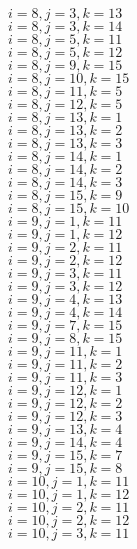 \documentclass[14pt]{article}
\begin{document}
    $i=8,j=3,k=13 $ \\ 
    $i=8,j=3,k=14 $ \\ 
    $i=8,j=5,k=11 $ \\ 
    $i=8,j=5,k=12 $ \\ 
    $i=8,j=9,k=15 $ \\ 
    $i=8,j=10,k=15 $ \\ 
    $i=8,j=11,k=5 $ \\ 
    $i=8,j=12,k=5 $ \\ 
    $i=8,j=13,k=1 $ \\ 
    $i=8,j=13,k=2 $ \\ 
    $i=8,j=13,k=3 $ \\ 
    $i=8,j=14,k=1 $ \\ 
    $i=8,j=14,k=2 $ \\ 
    $i=8,j=14,k=3 $ \\ 
    $i=8,j=15,k=9 $ \\ 
    $i=8,j=15,k=10 $ \\ 
    $i=9,j=1,k=11 $ \\ 
    $i=9,j=1,k=12 $ \\ 
    $i=9,j=2,k=11 $ \\ 
    $i=9,j=2,k=12 $ \\ 
    $i=9,j=3,k=11 $ \\ 
    $i=9,j=3,k=12 $ \\ 
    $i=9,j=4,k=13 $ \\ 
    $i=9,j=4,k=14 $ \\ 
    $i=9,j=7,k=15 $ \\ 
    $i=9,j=8,k=15 $ \\ 
    $i=9,j=11,k=1 $ \\ 
    $i=9,j=11,k=2 $ \\ 
    $i=9,j=11,k=3 $ \\ 
    $i=9,j=12,k=1 $ \\ 
    $i=9,j=12,k=2 $ \\ 
    $i=9,j=12,k=3 $ \\ 
    $i=9,j=13,k=4 $ \\ 
    $i=9,j=14,k=4 $ \\ 
    $i=9,j=15,k=7 $ \\ 
    $i=9,j=15,k=8 $ \\ 
    $i=10,j=1,k=11 $ \\ 
    $i=10,j=1,k=12 $ \\ 
    $i=10,j=2,k=11 $ \\ 
    $i=10,j=2,k=12 $ \\ 
    $i=10,j=3,k=11 $ \\ 
\end{document}
